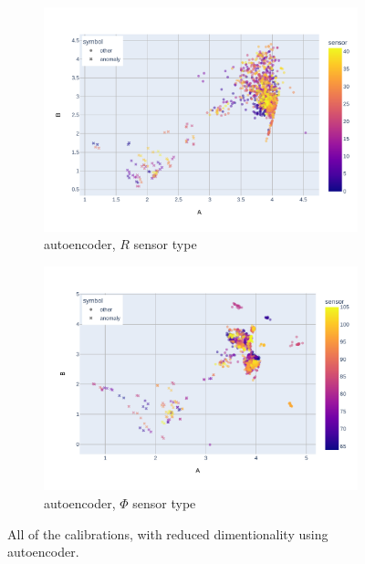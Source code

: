 \begin{figure}
\centering
\begin{subfigure}[b]{0.9\textwidth}
    \centering
    \includegraphics[width=\linewidth]{figures/chapter4/dimred/NN_module_R_all.pdf}
\caption{autoencoder, $R$ sensor type}
   \label{plot:nn_all_r}
  \end{subfigure}
\begin{subfigure}[b]{0.9\textwidth}
    \centering
    \includegraphics[width=\linewidth]{figures/chapter4/dimred/NN_module_phi_all.pdf}
\caption{autoencoder, $\Phi$ sensor type}
   \label{plot:nn_all_phi}
  \end{subfigure}

    \caption[All calibrationd]{All of the calibrations, with reduced dimentionality using autoencoder.}
\end{figure}

